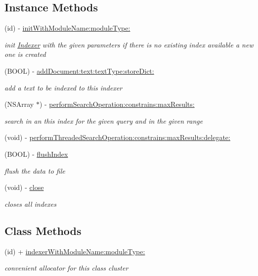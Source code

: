 \subsection*{Instance Methods}
\begin{DoxyCompactItemize}
\item 
(id) -\/ \hyperlink{interface_indexer_ac4827c0d4b7fdffc52937b1b8403428d}{init\-With\-Module\-Name\-:module\-Type\-:}
\begin{DoxyCompactList}\small\item\em init \hyperlink{interface_indexer}{Indexer} with the given parameters if there is no existing index available a new one is created \end{DoxyCompactList}\item 
(B\-O\-O\-L) -\/ \hyperlink{interface_indexer_a76ddfd778cc7ddc305409635fe350fde}{add\-Document\-:text\-:text\-Type\-:store\-Dict\-:}
\begin{DoxyCompactList}\small\item\em add a text to be indexed to this indexer \end{DoxyCompactList}\item 
(N\-S\-Array $\ast$) -\/ \hyperlink{interface_indexer_a1dbe2f78c6a44223cc67cfdaf0a8fa37}{perform\-Search\-Operation\-:constrains\-:max\-Results\-:}
\begin{DoxyCompactList}\small\item\em search in an this index for the given query and in the given range \end{DoxyCompactList}\item 
(void) -\/ \hyperlink{interface_indexer_aa8a894017e7732e2392ecd66d5602a2d}{perform\-Threaded\-Search\-Operation\-:constrains\-:max\-Results\-:delegate\-:}
\item 
(B\-O\-O\-L) -\/ \hyperlink{interface_indexer_ae39bdaad9bad4b319163c3cb81ccd1ca}{flush\-Index}
\begin{DoxyCompactList}\small\item\em flush the data to file \end{DoxyCompactList}\item 
(void) -\/ \hyperlink{interface_indexer_a5ae591df94fc66ccb85cbb6565368bca}{close}
\begin{DoxyCompactList}\small\item\em closes all indexes \end{DoxyCompactList}\end{DoxyCompactItemize}
\subsection*{Class Methods}
\begin{DoxyCompactItemize}
\item 
(id) + \hyperlink{interface_indexer_aad97ed9b0e34c2bf33b25b823996b245}{indexer\-With\-Module\-Name\-:module\-Type\-:}
\begin{DoxyCompactList}\small\item\em convenient allocator for this class cluster \end{DoxyCompactList}\end{DoxyCompactItemize}
